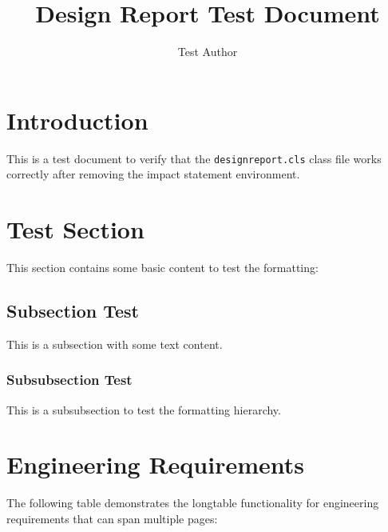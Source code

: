 \documentclass{designreport}
\title{Design Report Test Document}
\author{Test Author}
\begin{document}
\maketitle

\tableofcontents
\newpage

\section{Introduction}

This is a test document to verify that the \texttt{designreport.cls} class file works correctly after removing the impact statement environment.

\section{Test Section}

This section contains some basic content to test the formatting:

\subsection{Subsection Test}

This is a subsection with some text content.

\subsubsection{Subsubsection Test}

This is a subsubsection to test the formatting hierarchy.

\section{Engineering Requirements}

The following table demonstrates the longtable functionality for engineering requirements that can span multiple pages:
\end{document}
